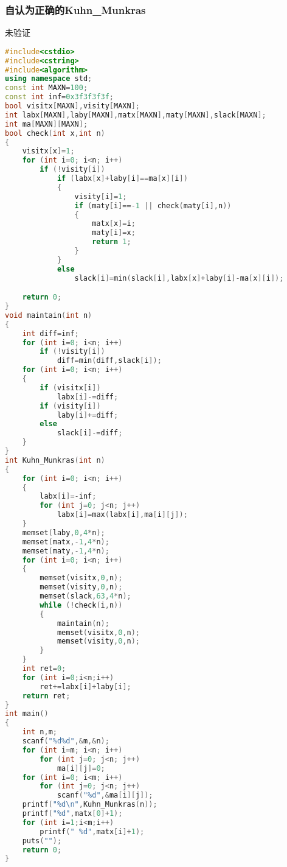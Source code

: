 	\subsubsection{自认为正确的Kuhn\_Munkras}
	未验证
	\begin{lstlisting}[language=c++]
#include<cstdio>
#include<cstring>
#include<algorithm>
using namespace std;
const int MAXN=100;
const int inf=0x3f3f3f3f;
bool visitx[MAXN],visity[MAXN];
int labx[MAXN],laby[MAXN],matx[MAXN],maty[MAXN],slack[MAXN];
int ma[MAXN][MAXN];
bool check(int x,int n)
{
	visitx[x]=1;
	for (int i=0; i<n; i++)
		if (!visity[i])
			if (labx[x]+laby[i]==ma[x][i])
			{
				visity[i]=1;
				if (maty[i]==-1 || check(maty[i],n))
				{
					matx[x]=i;
					maty[i]=x;
					return 1;
				}
			}
			else
				slack[i]=min(slack[i],labx[x]+laby[i]-ma[x][i]);

	return 0;
}
void maintain(int n)
{
	int diff=inf;
	for (int i=0; i<n; i++)
		if (!visity[i])
			diff=min(diff,slack[i]);
	for (int i=0; i<n; i++)
	{
		if (visitx[i])
			labx[i]-=diff;
		if (visity[i])
			laby[i]+=diff;
		else
			slack[i]-=diff;
	}
}
int Kuhn_Munkras(int n)
{
	for (int i=0; i<n; i++)
	{
		labx[i]=-inf;
		for (int j=0; j<n; j++)
			labx[i]=max(labx[i],ma[i][j]);
	}
	memset(laby,0,4*n);
	memset(matx,-1,4*n);
	memset(maty,-1,4*n);
	for (int i=0; i<n; i++)
	{
		memset(visitx,0,n);
		memset(visity,0,n);
		memset(slack,63,4*n);
		while (!check(i,n))
		{
			maintain(n);
			memset(visitx,0,n);
			memset(visity,0,n);
		}
	}
	int ret=0;
	for (int i=0;i<n;i++)
		ret+=labx[i]+laby[i];
	return ret;
}
int main()
{
	int n,m;
	scanf("%d%d",&m,&n);
	for (int i=m; i<n; i++)
		for (int j=0; j<n; j++)
			ma[i][j]=0;
	for (int i=0; i<m; i++)
		for (int j=0; j<n; j++)
			scanf("%d",&ma[i][j]);
	printf("%d\n",Kuhn_Munkras(n));
	printf("%d",matx[0]+1);
	for (int i=1;i<m;i++)
		printf(" %d",matx[i]+1);
	puts("");
	return 0;
}
	\end{lstlisting}